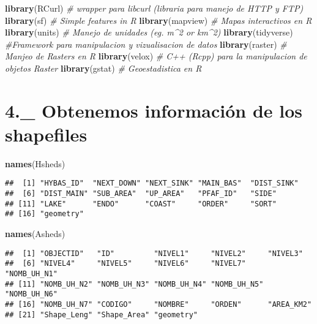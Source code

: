 \documentclass[]{article}
\newenvironment{Shaded}{\begin{snugshade}}{\end{snugshade}}
\newcommand{\KeywordTok}[1]{\textcolor[rgb]{0.13,0.29,0.53}{\textbf{#1}}}
\newcommand{\CommentTok}[1]{\textcolor[rgb]{0.56,0.35,0.01}{\textit{#1}}}
\newcommand{\NormalTok}[1]{#1}
\begin{document}
\begin{Shaded}
\begin{Highlighting}[]
\KeywordTok{library}\NormalTok{(RCurl) }\CommentTok{# wrapper para libcurl (libraria para manejo de HTTP y FTP)}
\KeywordTok{library}\NormalTok{(sf) }\CommentTok{# Simple features in R}
\KeywordTok{library}\NormalTok{(mapview) }\CommentTok{# Mapas interactivos en R}
\KeywordTok{library}\NormalTok{(units) }\CommentTok{# Manejo de unidades (eg. m^2 or km^2)}
\KeywordTok{library}\NormalTok{(tidyverse) }\CommentTok{#Framework para manipulacion y vizualisacion de datos}
\KeywordTok{library}\NormalTok{(raster) }\CommentTok{# Manjeo de Rasters en R}
\KeywordTok{library}\NormalTok{(velox) }\CommentTok{# C++ (Rcpp) para la manipulacion de objetos Raster}
\KeywordTok{library}\NormalTok{(gstat) }\CommentTok{# Geoestadistica en R}
\end{Highlighting}
\end{Shaded}

\section{4.\_ Obtenemos información de los
shapefiles}\label{obtenemos-informacion-de-los-shapefiles}

\begin{Shaded}
\begin{Highlighting}[]
\KeywordTok{names}\NormalTok{(Hsheds)}
\end{Highlighting}
\end{Shaded}

\begin{verbatim}
##  [1] "HYBAS_ID"  "NEXT_DOWN" "NEXT_SINK" "MAIN_BAS"  "DIST_SINK"
##  [6] "DIST_MAIN" "SUB_AREA"  "UP_AREA"   "PFAF_ID"   "SIDE"     
## [11] "LAKE"      "ENDO"      "COAST"     "ORDER"     "SORT"     
## [16] "geometry"
\end{verbatim}

\begin{Shaded}
\begin{Highlighting}[]
\KeywordTok{names}\NormalTok{(Asheds)}
\end{Highlighting}
\end{Shaded}

\begin{verbatim}
##  [1] "OBJECTID"   "ID"         "NIVEL1"     "NIVEL2"     "NIVEL3"    
##  [6] "NIVEL4"     "NIVEL5"     "NIVEL6"     "NIVEL7"     "NOMB_UH_N1"
## [11] "NOMB_UH_N2" "NOMB_UH_N3" "NOMB_UH_N4" "NOMB_UH_N5" "NOMB_UH_N6"
## [16] "NOMB_UH_N7" "CODIGO"     "NOMBRE"     "ORDEN"      "AREA_KM2"  
## [21] "Shape_Leng" "Shape_Area" "geometry"
\end{verbatim}
\end{document}
